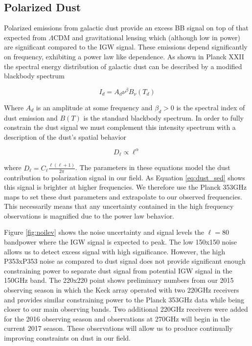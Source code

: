 \documentclass[12pt]{article}
\begin{document}
\subsection{Polarized Dust}
Polarized emissions from galactic dust provide an excess BB signal on top of
that expected from $\Lambda$CDM and gravitational lensing which (although low
in power) are significant compared to the IGW signal. These emissions depend
significantly on frequency, exhibiting a power law like dependence. As shown
in Planck XXII \cite{cite:PlanckXXII} the spectral energy distribution of
galactic dust can be described by a modified blackbody spectrum

\begin{equation}
	I_d=A_d\nu ^\beta B_{\nu}(T_d)
	\label{eq:dust_sed}
\end{equation}

Where $A_d$ is an amplitude at some frequency and $\beta _d > 0$ is the spectral
index of dust emission and $B(T)$ is the standard blackbody spectrum. In order
to fully constrain the dust signal we must complement this intensity
spectrum with a description of the dust's spatial behavior

\begin{equation}
	D_\ell \propto \ell^\alpha
	\label{eq:dust_aps}
\end{equation}

where $D_\ell=C_\ell \frac{\ell(\ell +1)}{2\pi}$. The parameters in these
equations model the dust contribution to polarization signal in our field. As
Equation \ref{eq:dust_sed} shows this signal is brighter at higher
frequencies. We therefore use the Planck 353GHz maps to set these dust
parameters and extrapolate to our observed frequencies. This necessarily means
that any uncertainty contained in the high frequency observations is magnified
due to the power law behavior.

Figure \ref{fig:noilev} shows the noise uncertainty and signal levels
the $\ell=80$ bandpower where the IGW signal is expected to peak. The low 150x150
noise allows us to detect excess signal with high significance. However, the high P353xP353
noise as compared to dust signal does not provide significant enough
constraining power to separate dust signal from potential IGW signal in the
150GHz band. The 220x220 point shows preliminary numbers from our 2015
observing season in which the Keck array operated with two 220GHz receivers
and provides similar constraining power to the Planck 353GHz data while being
closer to our main observing bands. Two additional 220GHz receivers were added
for the 2016 observing season and observations at 270GHz will begin in the
current 2017 season. These observations will allow us to produce continually
improving constraints on dust in our field.
\end{document}
